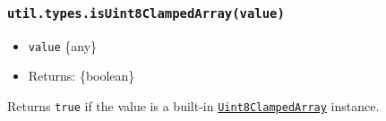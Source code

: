 \begin{Shaded}
\begin{Highlighting}[]
\NormalTok{(} \NormalTok{())}\OperatorTok{;}  
\NormalTok{(} \NormalTok{())}\OperatorTok{;}  
\NormalTok{(} \NormalTok{())}\OperatorTok{;}  
\end{Highlighting}
\end{Shaded}

\subsubsection{\texorpdfstring{\texttt{util.types.isUint8ClampedArray(value)}}{util.types.isUint8ClampedArray(value)}}\label{util.types.isuint8clampedarrayvalue}

\begin{itemize}
\tightlist
\item
  \texttt{value} \{any\}
\item
  Returns: \{boolean\}
\end{itemize}

Returns \texttt{true} if the value is a built-in
\href{https://developer.mozilla.org/en-US/docs/Web/JavaScript/Reference/Global_Objects/Uint8ClampedArray}{\texttt{Uint8ClampedArray}}
instance.

\begin{Shaded}
\begin{Highlighting}[]
\NormalTok{(} \NormalTok{())}\OperatorTok{;}  
\NormalTok{(} \NormalTok{())}\OperatorTok{;}  
\NormalTok{(} \NormalTok{())}\OperatorTok{;}  
\end{Highlighting}
\end{Shaded}


